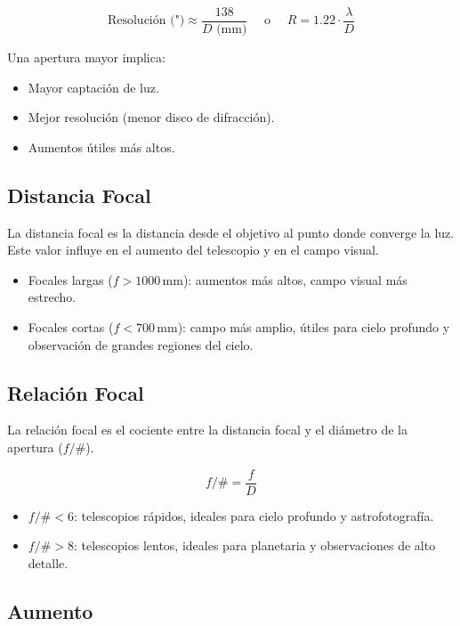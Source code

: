 \begin{equation}
	\text{Resolución (")} \approx \frac{138}{D \text{ (mm)}} \quad \text{ o } \quad R = 1.22 \cdot \frac{\lambda}{D}
\end{equation}

Una apertura mayor implica:
\begin{itemize}
	\item Mayor captación de luz.
	\item Mejor resolución (menor disco de difracción).
	\item Aumentos útiles más altos.
\end{itemize}

\subsection*{Distancia Focal}

La distancia focal es la distancia desde el objetivo al punto donde converge la luz. Este valor influye en el aumento del telescopio y en el campo visual. 

\begin{itemize}
	\item Focales largas ($f > 1000\,\text{mm}$): aumentos más altos, campo visual más estrecho.
	\item Focales cortas ($f < 700\,\text{mm}$): campo más amplio, útiles para cielo profundo y observación de grandes regiones del cielo.
\end{itemize}

\subsection*{Relación Focal}

La relación focal es el cociente entre la distancia focal y el diámetro de la apertura ($f/\#$). 

\[
f/\# = \frac{f}{D}
\]

\begin{itemize}
	\item $f/\# < 6$: telescopios rápidos, ideales para cielo profundo y astrofotografía.
	\item $f/\# > 8$: telescopios lentos, ideales para planetaria y observaciones de alto detalle.
\end{itemize}

\subsection*{Aumento}

